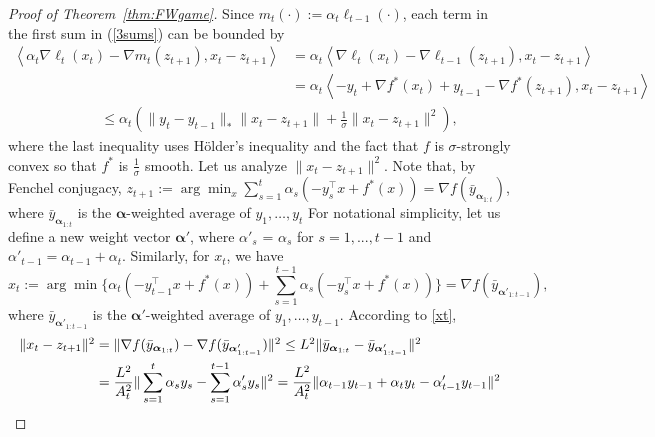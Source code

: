 \documentclass[final,12pt]{colt2018} %
\def\balpha{\boldsymbol{\alpha}}
\newcommand{\lr}[2]{\left\langle#1,#2\right\rangle}
\newcommand{\pr}[1]{\left(#1\right)}
\begin{document}
\begin{proof}[Proof of Theorem~\ref{thm:FWgame}]
	Since $m_{t}(\cdot) := \alpha_{t} \ell_{t-1}(\cdot)$,
	each term in the first sum in (\ref{3sums}) can be bounded by
	\begin{equation*} 
	\begin{aligned}
\textstyle  \lr{\alpha_t \nabla \ell_t(x_t) - \nabla m_t(z_{t+1})}{x_t - z_{t+1}}
	 & \textstyle = \alpha_t \lr{ \nabla \ell_t(x_t) - \nabla \ell_{t-1}(z_{t+1})}{x_t - z_{t+1}}
	\\ & \textstyle = \alpha_t \lr{ - y_t + \nabla f^*(x_t) + y_{t-1} - \nabla f^*(z_{t+1}) }{x_t - z_{t+1}}
	\end{aligned}
	\end{equation*}\vspace{-8mm}
	\begin{align}
\textstyle	 \quad\quad&\leq \alpha_t  \pr{ \| y_t - y_{t-1} \|_* \| x_t- z_{t+1} \| + \frac{1}{\sigma} \| x_t - z_{t+1} \|^2 },\label{tmp1}
	\end{align}
	where the last inequality uses  
	H\"older's inequality and 
	the fact that $f$ is $\sigma$-strongly convex
	so that $f^{*}$ is $\frac{1}{\sigma}$ smooth.
	Let us analyze $\| x_t- z_{t+1} \|^{2}$. Note that, by Fenchel conjugacy,
$\textstyle	z_{t+1} := \arg\min_x \sum_{s=1}^t \alpha_s ( -y_s^\top x + f^*(x)) = \nabla f(\bar{y}_{\balpha_{1:t}})$,
	where $\bar{y}_{\balpha_{1:t}}$ is the $\balpha$-weighted average of $y_1, \ldots, y_t$
	For notational simplicity, let us define a new weight vector $\balpha'$, where $\alpha'_s$ = $\alpha_s$ for $s = 1,...,t-1$ and $\alpha'_{t-1} = \alpha_{t-1} + \alpha_t$. 
		Similarly, for $x_{t}$, we have 
	\begin{equation} \label{xt}
\textstyle	x_t := \arg\min \{ \alpha_t ( -y_{t-1}^\top x + f^*(x)) +  \sum_{s=1}^{t-1} \alpha_s ( -y_s^\top x + f^*(x)) \}  = \nabla f( \bar{y}_{\balpha'_{1:t-1}}),
	\end{equation}
	where $\bar{y}_{\balpha'_{1:t-1}}$ is the $\balpha'$-weighted average of $y_1, \ldots, y_{t-1}$.
	According to \eqref{xt}, 
	\begin{equation*}
	\begin{aligned}
\textstyle	\| x_t- z_{t+1} \|^{2}  & \textstyle = \| \nabla f(\bar{y}_{\balpha_{1:t}}) -  \nabla f(\bar{y}_{\balpha'_{1:t-1}}) \|^2 
	\leq L^2 \| \bar{y}_{\balpha_{1:t}} -  \bar{y}_{\balpha'_{1:t-1}} \|^2
	\\\textstyle &= \frac{L^2}{A_t^2} \|  \sum_{s=1}^t \alpha_s y_s - \sum_{{s=1}}^{t-1} \alpha_s' y_s  \|^2 = \frac{L^2}{A_t^2} \| \alpha_{t-1} y_{t-1} + \alpha_t y_t - \alpha'_{t-1} y_{t-1} \|^2

\end{aligned}
\end{equation*}
\end{proof}
\end{document}
